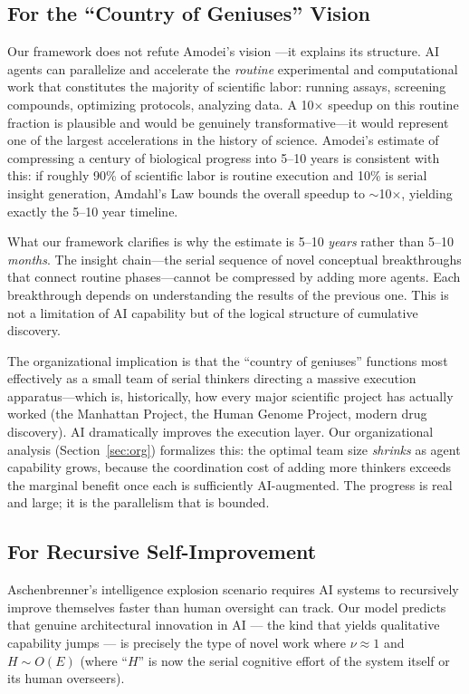 \documentclass[11pt,a4paper]{article}
\begin{document}
\subsection{For the ``Country of Geniuses'' Vision}

Our framework does not refute Amodei's vision \citep{amodei2024}---it explains its structure. AI agents can parallelize and accelerate the \emph{routine} experimental and computational work that constitutes the majority of scientific labor: running assays, screening compounds, optimizing protocols, analyzing data. A 10$\times$ speedup on this routine fraction is plausible and would be genuinely transformative---it would represent one of the largest accelerations in the history of science. Amodei's estimate of compressing a century of biological progress into 5--10 years is consistent with this: if roughly 90\% of scientific labor is routine execution and 10\% is serial insight generation, Amdahl's Law bounds the overall speedup to $\sim$10$\times$, yielding exactly the 5--10 year timeline.

What our framework clarifies is why the estimate is 5--10 \emph{years} rather than 5--10 \emph{months}. The insight chain---the serial sequence of novel conceptual breakthroughs that connect routine phases---cannot be compressed by adding more agents. Each breakthrough depends on understanding the results of the previous one. This is not a limitation of AI capability but of the logical structure of cumulative discovery.

The organizational implication is that the ``country of geniuses'' functions most effectively as a small team of serial thinkers directing a massive execution apparatus---which is, historically, how every major scientific project has actually worked (the Manhattan Project, the Human Genome Project, modern drug discovery). AI dramatically improves the execution layer. Our organizational analysis (Section~\ref{sec:org}) formalizes this: the optimal team size \emph{shrinks} as agent capability grows, because the coordination cost of adding more thinkers exceeds the marginal benefit once each is sufficiently AI-augmented. The progress is real and large; it is the parallelism that is bounded.

\subsection{For Recursive Self-Improvement}

Aschenbrenner's intelligence explosion scenario \citep{aschenbrenner2024} requires AI systems to recursively improve themselves faster than human oversight can track. Our model predicts that genuine architectural innovation in AI --- the kind that yields qualitative capability jumps --- is precisely the type of novel work where $\nu \approx 1$ and $H \sim O(E)$ (where ``$H$'' is now the serial cognitive effort of the system itself or its human overseers).
\end{document}
